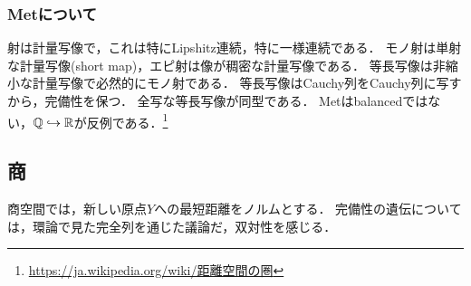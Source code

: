 \documentclass[uplatex,dvipdfmx]{jsreport}
\begin{document}
\subsubsection{Metについて}

\begin{tcolorbox}[colframe=ForestGreen, colback=ForestGreen!10!white,breakable,colbacktitle=ForestGreen!40!white,coltitle=black,fonttitle=\bfseries\sffamily,
title=]
    射は計量写像で，これは特にLipshitz連続，特に一様連続である．
    モノ射は単射な計量写像(short map)，エピ射は像が稠密な計量写像である．
    等長写像は非縮小な計量写像で必然的にモノ射である．
    等長写像はCauchy列をCauchy列に写すから，完備性を保つ．
    全写な等長写像が同型である．
    Metはbalancedではない，$\mathbb{Q}\hookrightarrow\mathbb{R}$が反例である．\footnote{\url{https://ja.wikipedia.org/wiki/距離空間の圏}}
\end{tcolorbox}

\subsection{商}

\begin{tcolorbox}[colframe=ForestGreen, colback=ForestGreen!10!white,breakable,colbacktitle=ForestGreen!40!white,coltitle=black,fonttitle=\bfseries\sffamily,
title=]
    商空間では，新しい原点$Y$への最短距離をノルムとする．
    完備性の遺伝については，環論で見た完全列を通じた議論だ，双対性を感じる．
\end{tcolorbox}
\end{document}
